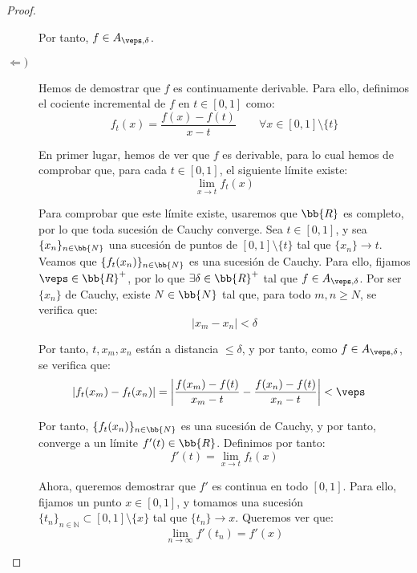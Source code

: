 \documentclass[12pt]{article}
\begin{document}
\begin{ejercicio}
\begin{proof}
\begin{description}
                Por tanto, $f\in A_{\veps,\delta}$.


                \item[$\Longleftarrow)$] Hemos de demostrar que $f$ es continuamente derivable. Para ello, definimos el cociente incremental de $f$ en $t\in [0,1]$ como:
                \begin{equation*}
                    f_t(x) = \frac{f(x)-f(t)}{x-t} \qquad \forall x\in [0,1]\setminus\{t\}
                \end{equation*}

                En primer lugar, hemos de ver que $f$ es derivable, para lo cual hemos de comprobar que, para cada $t\in [0,1]$, el siguiente límite existe:
                \begin{equation*}
                    \lim_{x\to t} f_t(x)
                \end{equation*}

                Para comprobar que este límite existe, usaremos que $\bb{R}$ es completo, por lo que toda sucesión de Cauchy converge. Sea $t\in [0,1]$, y sea $\{x_n\}_{n\in \bb{N}}$ una sucesión de puntos de $[0,1]\setminus\{t\}$ tal que $\{x_n\}\to t$. Veamos que $\{f_t(x_n)\}_{n\in \bb{N}}$ es una sucesión de Cauchy. Para ello, fijamos $\veps\in \bb{R}^+$, por lo que $\exists \delta\in \bb{R}^+$ tal que $f\in A_{\veps,\delta}$. Por ser $\{x_n\}$ de Cauchy, existe $N\in \bb{N}$ tal que, para todo $m,n\geq N$, se verifica que:
                \begin{equation*}
                    |x_m-x_n| < \delta
                \end{equation*}

                Por tanto, $t,x_m,x_n$ están a distancia $\leq \delta$, y por tanto, como $f\in A_{\veps,\delta}$, se verifica que:
                \begin{align*}
                    \left|f_t(x_m) - f_t(x_n)\right| &= \left|\frac{f(x_m)-f(t)}{x_m-t} - \frac{f(x_n)-f(t)}{x_n-t}\right|< \veps
                \end{align*}

                Por tanto, $\{f_t(x_n)\}_{n\in \bb{N}}$ es una sucesión de Cauchy, y por tanto, converge a un límite $f'(t)\in \bb{R}$. Definimos por tanto:
                \begin{equation*}
                    f'(t) = \lim_{x\to t} f_t(x)
                \end{equation*}

                Ahora, queremos demostrar que \( f' \) es continua en todo \( [0,1] \). Para ello, fijamos un punto \( x \in [0,1] \), y tomamos una sucesión \( \{t_n\}_{n \in \mathbb{N}} \subset [0,1] \setminus \{x\} \) tal que \( \{t_n\} \to x \). Queremos ver que:
                \[
                \lim_{n \to \infty} f'(t_n) = f'(x)
                \]


\end{description}
\end{proof}
\end{ejercicio}
\end{document}
